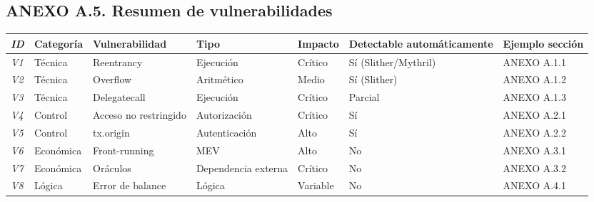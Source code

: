 \subsection{ANEXO A.5. Resumen de
vulnerabilidades}\label{anexo-a.5.-resumen-de-vulnerabilidades}

{\def\LTcaptype{none} %
\begin{longtable}[]{@{}
  >{\raggedright\arraybackslash}p{}
  >{\raggedright\arraybackslash}p{}
  >{\raggedright\arraybackslash}p{}
  >{\raggedright\arraybackslash}p{}
  >{\raggedright\arraybackslash}p{}
  >{\raggedright\arraybackslash}p{}
  >{\raggedright\arraybackslash}p{}@{}}
\toprule\noalign{}
\begin{minipage}[b]{\linewidth}\raggedright
\textbf{\emph{ID}}
\end{minipage} & \begin{minipage}[b]{\linewidth}\raggedright
\textbf{Categoría}
\end{minipage} & \begin{minipage}[b]{\linewidth}\raggedright
\textbf{Vulnerabilidad}
\end{minipage} & \begin{minipage}[b]{\linewidth}\raggedright
\textbf{Tipo}
\end{minipage} & \begin{minipage}[b]{\linewidth}\raggedright
\textbf{Impacto}
\end{minipage} & \begin{minipage}[b]{\linewidth}\raggedright
\textbf{Detectable automáticamente}
\end{minipage} & \begin{minipage}[b]{\linewidth}\raggedright
\textbf{Ejemplo sección}
\end{minipage} \\
\midrule\noalign{}
\endhead
\bottomrule\noalign{}
\endlastfoot
\emph{V1} & Técnica & Reentrancy & Ejecución & Crítico & Sí
(Slither/Mythril) & ANEXO A.1.1 \\
\emph{V2} & Técnica & Overflow & Aritmético & Medio & Sí (Slither) &
ANEXO A.1.2 \\
\emph{V3} & Técnica & Delegatecall & Ejecución & Crítico & Parcial &
ANEXO A.1.3 \\
\emph{V4} & Control & Acceso no restringido & Autorización & Crítico &
Sí & ANEXO A.2.1 \\
\emph{V5} & Control & tx.origin & Autenticación & Alto & Sí & ANEXO
A.2.2 \\
\emph{V6} & Económica & Front-running & MEV & Alto & No & ANEXO A.3.1 \\
\emph{V7} & Económica & Oráculos & Dependencia externa & Crítico & No &
ANEXO A.3.2 \\
\emph{V8} & Lógica & Error de balance & Lógica & Variable & No & ANEXO
A.4.1 \\
\end{longtable}
}
